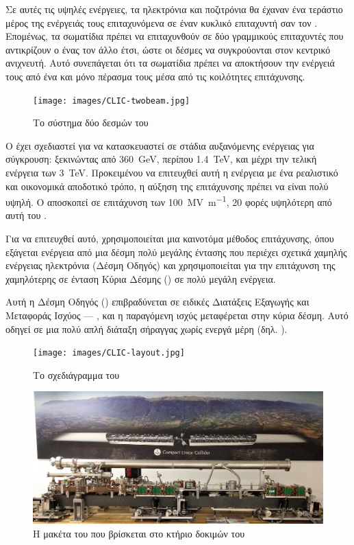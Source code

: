 Σε αυτές τις υψηλές ενέργειες, τα ηλεκτρόνια και ποζιτρόνια θα έχαναν ένα τεράστιο μέρος της ενέργειάς τους επιταχυνόμενα σε έναν κυκλικό επιταχυντή σαν τον . 
Επομένως, τα σωματίδια πρέπει να επιταχυνθούν σε δύο γραμμικούς επιταχυντές που αντικρίζουν ο ένας τον άλλο έτσι, ώστε οι δέσμες να συγκρούονται στον κεντρικό ανιχνευτή. 
Αυτό συνεπάγεται ότι τα σωματίδια πρέπει να αποκτήσουν την ενέργειά τους από ένα και μόνο πέρασμα τους μέσα από τις κοιλότητες επιτάχυνσης.

\begin{figure}[tph]
\texttt{[image: images/CLIC-twobeam.jpg]}
\centering
\caption{Το σύστημα δύο δεσμών του }
\label{img:CLICtwobeamscheme}
\end{figure}

Ο  έχει σχεδιαστεί για να κατασκευαστεί σε στάδια αυξανόμενης ενέργειας για σύγκρουση: ξεκινώντας από \SI{360}{\giga \electronvolt}, περίπου \SI{1.4}{\TeV}, και μέχρι την τελική ενέργεια των \SI{3}{\TeV}. 
Προκειμένου να επιτευχθεί αυτή η ενέργεια με ένα ρεαλιστικό και οικονομικά αποδοτικό τρόπο, η αύξηση της επιτάχυνσης πρέπει να είναι πολύ υψηλή.
Ο  αποσκοπεί σε επιτάχυνση των \SI[per-mode = symbol]{100}{\mega \volt \per \metre}, 20 φορές υψηλότερη από αυτή του .

Για να επιτευχθεί αυτό, χρησιμοποιείται μια καινοτόμα μέθοδος επιτάχυνσης, όπου εξάγεται ενέργεια από μια δέσμη πολύ μεγάλης έντασης που περιέχει σχετικά χαμηλής ενέργειας ηλεκτρόνια (Δέσμη Οδηγός)  και χρησιμοποιείται για την επιτάχυνση της χαμηλότερης σε ένταση Κύρια Δέσμης () σε πολύ μεγάλη ενέργεια.

Αυτή η Δέσμη Οδηγός () επιβραδύνεται σε ειδικές Διατάξεις Εξαγωγής και Mεταφοράς Ισχύος --- , και η παραγόμενη  ισχύς μεταφέρεται στην κύρια δέσμη. 
Αυτό οδηγεί σε μια πολύ απλή διάταξη σήραγγας χωρίς ενεργά  μέρη (δηλ. ).

\begin{figure}[tph]
\texttt{[image: images/CLIC-layout.jpg]}
\centering
\caption{Το σχεδιάγραμμα του }
\label{img:CLIClayout}
\end{figure}

\begin{figure}[tph]
\includegraphics[width=\textwidth]{images/CLIC-maquette}
\centering
\caption[Η μακέτα του ]{Η μακέτα του  που βρίσκεται στο κτήριο δοκιμών  του }
\label{img:CLIClmaquette}
\end{figure}

